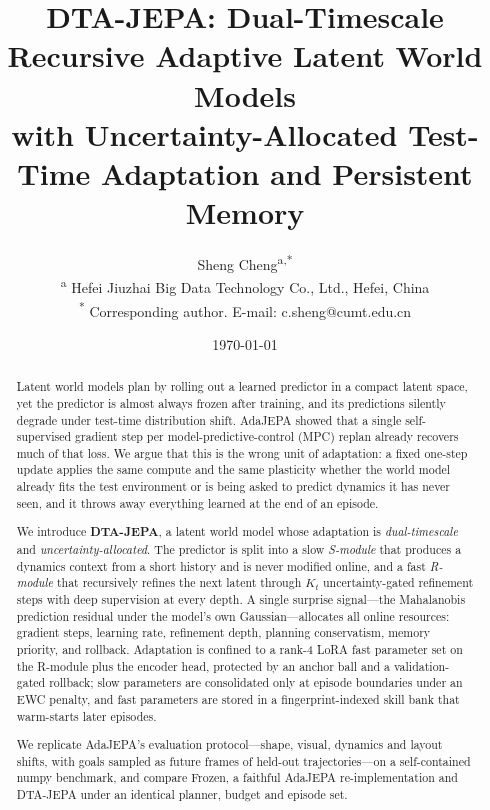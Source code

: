 \documentclass[a4paper]{article}
\title{\bfseries\Large DTA-JEPA: Dual-Timescale Recursive Adaptive Latent World Models\\[2pt]
\large with Uncertainty-Allocated Test-Time Adaptation and Persistent Memory}
\author{Sheng Cheng\textsuperscript{a,*}\\
\normalsize\textsuperscript{a} Hefei Jiuzhai Big Data Technology Co., Ltd., Hefei, China\\
\normalsize\textsuperscript{*} Corresponding author. E-mail: c.sheng@cumt.edu.cn}
\date{\today}
\theoremstyle{cnplain}
\theoremstyle{cndef}
\begin{document}
\maketitle

\begin{abstract}
\noindent Latent world models plan by rolling out a learned predictor in a compact latent
space, yet the predictor is almost always frozen after training, and its predictions silently
degrade under test-time distribution shift. AdaJEPA showed that a single self-supervised
gradient step per model-predictive-control (MPC) replan already recovers much of that loss.
We argue that this is the wrong unit of adaptation: a fixed one-step update applies the same
compute and the same plasticity whether the world model already fits the test environment or
is being asked to predict dynamics it has never seen, and it throws away everything learned at
the end of an episode.

\medskip
\noindent We introduce \textbf{DTA-JEPA}, a latent world model whose adaptation is
\emph{dual-timescale} and \emph{uncertainty-allocated}. The predictor is split into a slow
\emph{S-module} that produces a dynamics context from a short history and is never modified
online, and a fast \emph{R-module} that recursively refines the next latent through $K_t$
uncertainty-gated refinement steps with deep supervision at every depth. A single surprise
signal---the Mahalanobis prediction residual under the model's own Gaussian---allocates all
online resources: gradient steps, learning rate, refinement depth, planning conservatism,
memory priority, and rollback. Adaptation is confined to a rank-4 LoRA fast parameter set on
the R-module plus the encoder head, protected by an anchor ball and a validation-gated
rollback; slow parameters are consolidated only at episode boundaries under an EWC penalty,
and fast parameters are stored in a fingerprint-indexed skill bank that warm-starts later
episodes.

\medskip
\noindent We replicate AdaJEPA's evaluation protocol---shape, visual, dynamics and layout
shifts, with goals sampled as future frames of held-out trajectories---on a self-contained
numpy benchmark, and compare Frozen, a faithful AdaJEPA re-implementation and DTA-JEPA under an
identical planner, budget and episode set.


\end{abstract}
\end{document}
